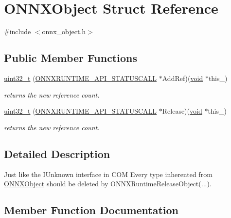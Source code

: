 \hypertarget{structONNXObject}{}\section{O\+N\+N\+X\+Object Struct Reference}
\label{structONNXObject}


{\ttfamily \#include $<$onnx\+\_\+object.\+h$>$}

\subsection*{Public Member Functions}
\begin{DoxyCompactItemize}
\item 
\mbox{\hyperlink{structONNXObject_a39039218cda3ea64b1a88e49d90844ab}{uint32\+\_\+t}} (\mbox{\hyperlink{error__code_8h_aeaeecdc9b792735c3e26fc0f9815c988}{O\+N\+N\+X\+R\+U\+N\+T\+I\+M\+E\+\_\+\+A\+P\+I\+\_\+\+S\+T\+A\+T\+U\+S\+C\+A\+LL}} $\ast$Add\+Ref)(\mbox{\hyperlink{mlasi_8h_a88f941d423cb2a819b70a1358982b1a6}{void}} $\ast$this\+\_\+)
\begin{DoxyCompactList}\small\item\em returns the new reference count. \end{DoxyCompactList}\item 
\mbox{\hyperlink{structONNXObject_aff32c8f5c44b75cffffdda19980ccae9}{uint32\+\_\+t}} (\mbox{\hyperlink{error__code_8h_aeaeecdc9b792735c3e26fc0f9815c988}{O\+N\+N\+X\+R\+U\+N\+T\+I\+M\+E\+\_\+\+A\+P\+I\+\_\+\+S\+T\+A\+T\+U\+S\+C\+A\+LL}} $\ast$Release)(\mbox{\hyperlink{mlasi_8h_a88f941d423cb2a819b70a1358982b1a6}{void}} $\ast$this\+\_\+)
\begin{DoxyCompactList}\small\item\em returns the new reference count. \end{DoxyCompactList}\end{DoxyCompactItemize}


\subsection{Detailed Description}
Just like the I\+Unknown interface in C\+OM Every type inherented from \mbox{\hyperlink{structONNXObject}{O\+N\+N\+X\+Object}} should be deleted by O\+N\+N\+X\+Runtime\+Release\+Object(...). 

\subsection{Member Function Documentation}
\mbox{\label{structONNXObject_a39039218cda3ea64b1a88e49d90844ab}} 
